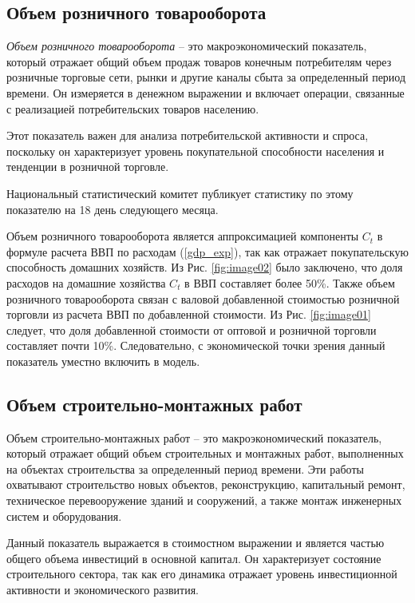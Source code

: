 \documentclass[a4paper, 14pt]{extreport}
\numberwithin{equation}{section}
\numberwithin{equation}{section}
\begin{document}
	
	\subsection{Объем розничного товарооборота}
	
	\textit{Объем розничного товарооборота} -- это макроэкономический показатель, который отражает общий объем продаж товаров конечным потребителям через розничные торговые сети, рынки и другие каналы сбыта за определенный период времени. Он измеряется в денежном выражении и включает операции, связанные с реализацией потребительских товаров населению.
	
	Этот показатель важен для анализа потребительской активности и спроса, поскольку он характеризует уровень покупательной способности населения и тенденции в розничной торговле.
	
	Национальный статистический комитет публикует статистику по этому показателю на 18 день следующего месяца.
	
	Объем розничного товарооборота является аппроксимацией компоненты $C_t$ в формуле расчета ВВП по расходам (\ref{gdp_exp}), так как отражает покупательскую способность домашних хозяйств. Из Рис. \ref{fig:image02} было заключено, что доля расходов на домашние хозяйства $C_t$ в ВВП составляет более 50\%. Также объем розничного товарооборота связан с валовой добавленной стоимостью розничной торговли из расчета ВВП по добавленной стоимости. Из Рис. \ref{fig:image01} следует, что доля добавленной стоимости от оптовой и розничной торговли составляет почти 10\%.
	Следовательно, с экономической точки зрения данный показатель уместно включить в модель.
	
	
	\subsection{Объем строительно-монтажных работ}
	
	Объем строительно-монтажных работ -- это макроэкономический показатель, который отражает общий объем строительных и монтажных работ, выполненных на объектах строительства за определенный период времени. Эти работы охватывают строительство новых объектов, реконструкцию, капитальный ремонт, техническое перевооружение зданий и сооружений, а также монтаж инженерных систем и оборудования.
	
	Данный показатель выражается в стоимостном выражении и является частью общего объема инвестиций в основной капитал. Он характеризует состояние строительного сектора, так как его динамика отражает уровень инвестиционной активности и экономического развития.
	
\end{document}
